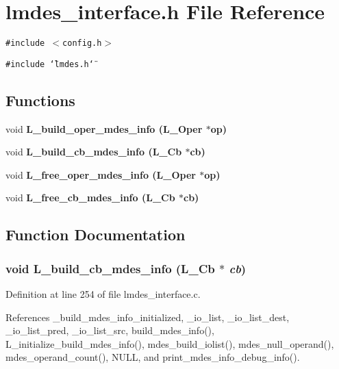\section{lmdes\_\-interface.h File Reference}
\label{lmdes__interface_8h}
{\tt \#include $<$config.h$>$}\par
{\tt \#include \char`\"{}lmdes.h\char`\"{}}\par
\subsection*{Functions}
\begin{CompactItemize}
\item 
void \bf{L\_\-build\_\-oper\_\-mdes\_\-info} (L\_\-Oper $\ast$op)
\item 
void \bf{L\_\-build\_\-cb\_\-mdes\_\-info} (L\_\-Cb $\ast$cb)
\item 
void \bf{L\_\-free\_\-oper\_\-mdes\_\-info} (L\_\-Oper $\ast$op)
\item 
void \bf{L\_\-free\_\-cb\_\-mdes\_\-info} (L\_\-Cb $\ast$cb)
\end{CompactItemize}


\subsection{Function Documentation}
\subsubsection{\setlength{\rightskip}{0pt plus 5cm}void L\_\-build\_\-cb\_\-mdes\_\-info (L\_\-Cb $\ast$ {\em cb})}\label{lmdes__interface_8h_2d2835ec3cbec05456f9a6c34bf5eb92}




Definition at line 254 of file lmdes\_\-interface.c.

References \_\-build\_\-mdes\_\-info\_\-initialized, \_\-io\_\-list, \_\-io\_\-list\_\-dest, \_\-io\_\-list\_\-pred, \_\-io\_\-list\_\-src, build\_\-mdes\_\-info(), L\_\-initialize\_\-build\_\-mdes\_\-info(), mdes\_\-build\_\-iolist(), mdes\_\-null\_\-operand(), mdes\_\-operand\_\-count(), NULL, and print\_\-mdes\_\-info\_\-debug\_\-info().
